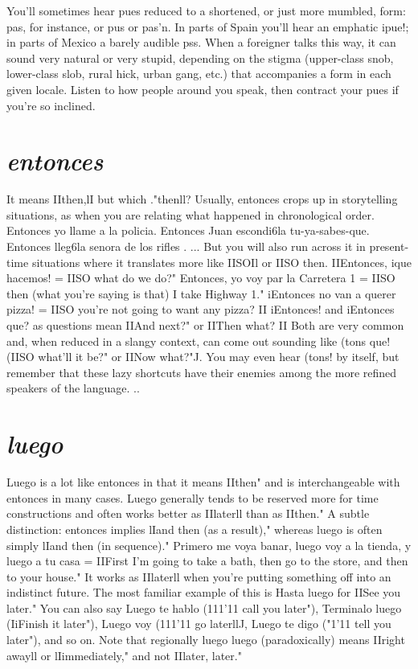 \documentclass[14pt,a4paper,oneside]{memoir}
\begin{document}
You'll sometimes hear pues reduced to a shortened, or just
more mumbled, form: pas, for instance, or pus or pas'n. In parts of
Spain you'll hear an emphatic ipue!; in parts of Mexico a barely audible pss. When a foreigner talks this way, it can sound very natural
or very stupid, depending on the stigma (upper-class snob, lower-class
slob, rural hick, urban gang, etc.) that accompanies a form in each
given locale. Listen to how people around you speak, then contract
your pues if you're so inclined.

\section{\emph{entonces}}

It means IIthen,lI but which ."thenll? Usually, entonces crops
up in storytelling situations, as when you are relating what happened
in chronological order. Entonces yo llame a la policia. Entonces Juan
escondi6la tu-ya-sabes-que. Entonces lleg6la senora de los rifles . ...
But you will also run across it in present-time situations where it
translates more like IISOIl or IISO then. IIEntonces, ique hacemos! = IISO
what do we do?" Entonces, yo voy par la Carretera 1 = IISO then (what
you're saying is that) I take Highway 1." iEntonces no van a querer
pizza! = IISO you're not going to want any pizza? II iEntonces! and iEntonces que? as questions mean IIAnd next?" or IIThen what? II Both are
very common and, when reduced in a slangy context, can come out
sounding like (tons que! (IISO what'll it be?" or IINow what?"J. You
may even hear (tons! by itself, but remember that these lazy shortcuts
have their enemies among the more refined speakers of the language.
..

\section{\emph{luego}}

Luego is a lot like entonces in that it means IIthen" and is interchangeable with entonces in many cases. Luego generally tends
to be reserved more for time constructions and often works better as
IIlaterll than as IIthen." A subtle distinction: entonces implies lIand
then (as a result)," whereas luego is often simply lIand then (in sequence)." Primero me voya banar, luego voy a la tienda, y luego a tu
casa = IIFirst I'm going to take a bath, then go to the store, and then
to your house." It works as IIlaterll when you're putting something off
into an indistinct future. The most familiar example of this is Hasta
luego for IISee you later." You can also say Luego te hablo (111'11 call
you later"), Terminalo luego (IiFinish it later"), Luego voy (111'11 go
laterllJ, Luego te digo ("1'11 tell you later"), and so on. Note that regionally luego luego (paradoxically) means IIright awayll or lIimmediately,"
and not IIlater, later."
\end{document}
